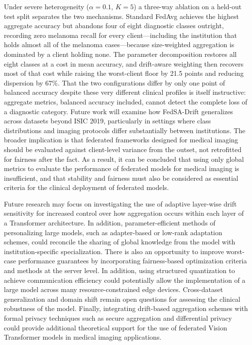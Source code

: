 \documentclass[utf8]{FrontiersinHarvard} %
\newcommand{\sadrift}{FedSA-Drift}
\begin{document}
Under severe heterogeneity ($\alpha = 0.1$, $K = 5$) a three-way ablation on a held-out test split separates the two mechanisms. Standard FedAvg achieves the highest aggregate accuracy but abandons four of eight diagnostic classes outright, recording zero melanoma recall for every client---including the institution that holds almost all of the melanoma cases---because size-weighted aggregation is dominated by a client holding none. The parameter decomposition restores all eight classes at a cost in mean accuracy, and drift-aware weighting then recovers most of that cost while raising the worst-client floor by 21.5 points and reducing dispersion by 67\%. That the two configurations differ by only one point of balanced accuracy despite these very different clinical profiles is itself instructive: aggregate metrics, balanced accuracy included, cannot detect the complete loss of a diagnostic category. Future work will examine how \sadrift{} generalizes across datasets beyond ISIC 2019, particularly in settings where class distributions and imaging protocols differ substantially between institutions. The broader implication is that federated frameworks designed for medical imaging should be evaluated against client-level variance from the outset, not retrofitted for fairness after the fact. As a result, it can be concluded that using only global metrics to evaluate the performance of federated models for medical imaging is insufficient, and that stability and fairness must also be considered as essential criteria for the clinical deployment of federated models.

Future research may focus on investigating the use of adaptive layer-wise drift sensitivity for increased control over how aggregation occurs within each layer of a Transformer architecture. In addition, parameter-efficient methods of personalizing large models, such as adapter-based or low-rank adaptation schemes, could reconcile the sharing of global knowledge from the model with institution-specific specialization. There is also an opportunity to improve worst-case performance guarantees by incorporating fairness-based optimization criteria and methods at the server level. In addition, using structured quantization to achieve communication efficiency could potentially allow the implementation of a large model across many resource-constrained edge devices. Cross-dataset generalization and domain shift remain open questions for assessing the clinical robustness of the model. Finally, integrating drift-based aggregation schemes with formal privacy techniques such as secure aggregation and differential privacy could provide additional theoretical support for the use of federated Vision Transformer models in medical imaging applications.
\end{document}
